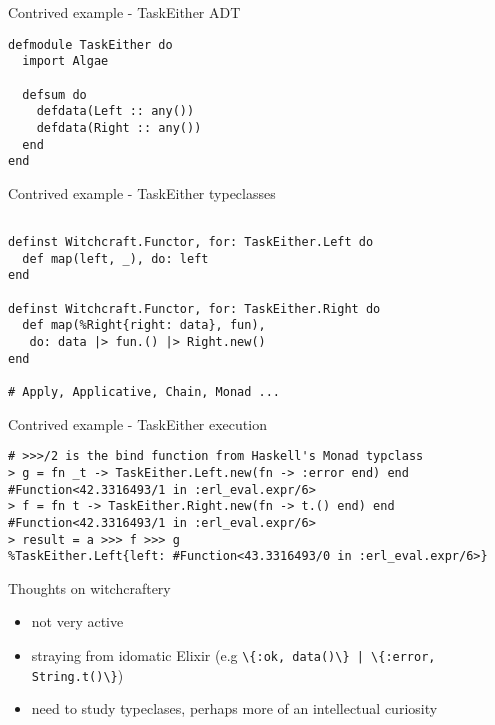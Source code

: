 \documentclass[
  ignorenonframetext,
]{beamer}
\newcommand{\passthrough}[1]{#1}
\providecommand{\tightlist}{%
  \setlength{\itemsep}{0pt}\setlength{\parskip}{0pt}}
\begin{document}
\begin{frame}[fragile]{Contrived example - TaskEither ADT}
\protect\hypertarget{contrived-example---taskeither-adt}{}
\begin{lstlisting}
defmodule TaskEither do
  import Algae

  defsum do
    defdata(Left :: any())
    defdata(Right :: any())
  end
end
\end{lstlisting}
\end{frame}

\begin{frame}[fragile]{Contrived example - TaskEither typeclasses}
\protect\hypertarget{contrived-example---taskeither-typeclasses}{}
\begin{lstlisting}

definst Witchcraft.Functor, for: TaskEither.Left do
  def map(left, _), do: left
end

definst Witchcraft.Functor, for: TaskEither.Right do
  def map(%Right{right: data}, fun),
   do: data |> fun.() |> Right.new()
end

# Apply, Applicative, Chain, Monad ...
\end{lstlisting}
\end{frame}

\begin{frame}[fragile]{Contrived example - TaskEither execution}
\protect\hypertarget{contrived-example---taskeither-execution}{}
\begin{lstlisting}
# >>>/2 is the bind function from Haskell's Monad typclass
> g = fn _t -> TaskEither.Left.new(fn -> :error end) end
#Function<42.3316493/1 in :erl_eval.expr/6>
> f = fn t -> TaskEither.Right.new(fn -> t.() end) end
#Function<42.3316493/1 in :erl_eval.expr/6>
> result = a >>> f >>> g
%TaskEither.Left{left: #Function<43.3316493/0 in :erl_eval.expr/6>}
\end{lstlisting}
\end{frame}

\begin{frame}[fragile]{Thoughts on witchcraftery}
\protect\hypertarget{thoughts-on-witchcraftery}{}
\begin{itemize}
\tightlist
\item
  not very active
\item
  straying from idomatic Elixir (e.g
  \passthrough{\lstinline!\{:ok, data()\} | \{:error, String.t()\}!})
\item
  need to study typeclases, perhaps more of an intellectual curiosity
\end{itemize}
\end{frame}
\end{document}

